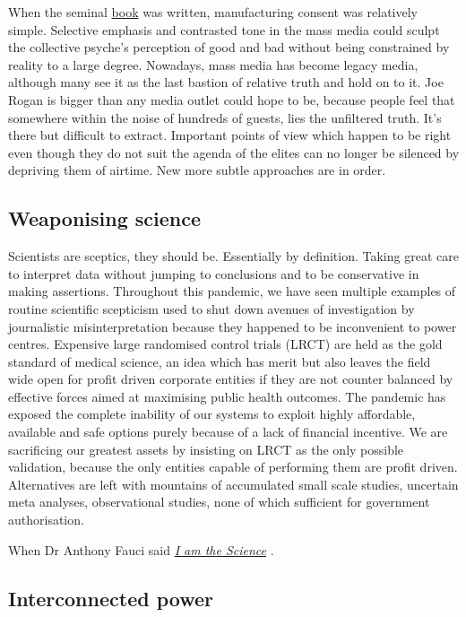 \documentclass[11pt,a4paper,notitlepage]{report}
\begin{document}
When the seminal \href{https://en.wikipedia.org/wiki/Manufacturing_Consent}{book} was written, manufacturing consent was  relatively simple. Selective emphasis and contrasted tone in the mass media could sculpt the collective psyche's perception of good and bad without being constrained by reality to a large degree. Nowadays, mass media has become legacy media, although many see it as the last bastion of relative truth and hold on to it. Joe Rogan is bigger than any media outlet could hope to be, because people feel that somewhere within the noise of hundreds of guests, lies the unfiltered truth. It's there but difficult to extract. Important points of view which happen to be right even though they do not suit the agenda of the elites can no longer be silenced by depriving them of airtime. New more subtle approaches are in order.

\subsection*{Weaponising science}

Scientists are sceptics, they should be. Essentially by definition. Taking great care to interpret data without jumping to conclusions and to be conservative in making assertions. Throughout this pandemic, we have seen multiple examples of routine scientific scepticism used to shut down avenues of investigation by journalistic misinterpretation because they happened to be inconvenient to power centres. Expensive large randomised control trials (LRCT) are held as the gold standard of medical science, an idea which has merit but also leaves the field wide open for profit driven corporate entities if they are not counter balanced by effective forces aimed at maximising public health outcomes. The pandemic has exposed the complete inability of our systems to exploit highly affordable, available and safe options purely because of a lack of financial incentive. We are sacrificing our greatest assets by insisting on LRCT as the only possible validation, because the only entities capable of performing them are profit driven. Alternatives are left with mountains of accumulated small scale studies, uncertain meta analyses, observational studies, none of which sufficient for government authorisation.

When Dr Anthony Fauci said \href{https://www.nationalreview.com/2021/11/anthony-fauci-i-am-the-science/}{\textit{I am the Science}} \cite{nationalreview29112021}.

\subsection*{Interconnected power}
\end{document}
